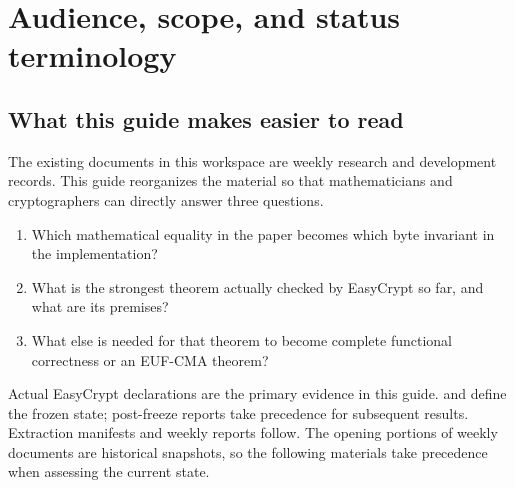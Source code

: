 \section{Audience, scope, and status terminology}
\label{sec:orientation}

\subsection{What this guide makes easier to read}

The existing  documents in this workspace are weekly
research and development records. This guide reorganizes the material so that
mathematicians and cryptographers can directly answer three questions.

\begin{enumerate}
  \item Which mathematical equality in the paper becomes which byte invariant in the implementation?
  \item What is the strongest theorem actually checked by EasyCrypt so far, and what are its premises?
  \item What else is needed for that theorem to become complete functional correctness or an EUF-CMA theorem?
\end{enumerate}

Actual EasyCrypt declarations are the primary evidence in this guide.
 and 
define the frozen state; post-freeze reports take precedence for subsequent
results. Extraction manifests and weekly reports follow. The opening portions
of weekly documents are historical snapshots, so the following materials take
precedence when assessing the current state.

